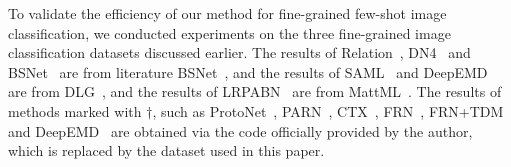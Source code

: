 \documentclass[letterpaper]{article} %
\begin{document}
To validate the efficiency of our method for fine-grained few-shot image classification, we conducted experiments on the {three} fine-grained image classification datasets discussed earlier.
The results of Relation~\cite{8578229}, DN4~\cite{8953758} and BSNet~\cite{9293172} are from literature BSNet~\cite{9293172}, and the results of SAML~\cite{Hao2019CollectAS} and DeepEMD~\cite{Zhang_2020_CVPR} are from DLG~\cite{Cao2022AFF}, and the results of LRPABN~\cite{Huang2021LowRankPA} are from MattML~\cite{zhu2020multi}. The results of methods marked with $\dag$, such as ProtoNet~\cite{NIPS2017_cb8da676}, PARN~\cite{Wu_2019_ICCV}, CTX~\cite{NEURIPS2020_fa28c6cd}, FRN~\cite{Wertheimer_2021_CVPR}, FRN+TDM~\cite{lee2022task} and DeepEMD~\cite{Zhang_2020_CVPR} are obtained via the code officially provided by the author, which is replaced by the dataset used in this paper.
\end{document}
